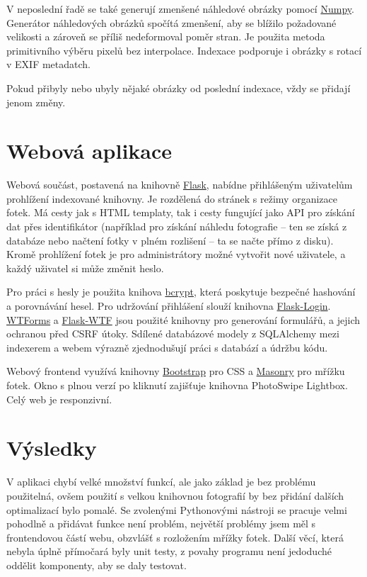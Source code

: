 \documentclass[czech]{template/pyt-report}
\begin{document}
V neposlední řadě se také generují zmenšené náhledové obrázky pomocí 
\href{https://numpy.org/}{Numpy}.
Generátor náhledových obrázků spočítá zmenšení, aby se blížilo požadované velikosti
a zároveň se příliš nedeformoval poměr stran. Je použita metoda primitivního 
výběru pixelů bez interpolace. Indexace podporuje i obrázky s rotací v EXIF metadatch.

Pokud přibyly nebo ubyly nějaké obrázky od poslední indexace, vždy se přidají jenom změny.
\section{Webová aplikace}
Webová součást, postavená na knihovně \href{https://flask.pocoo.org/}{Flask}, nabídne
přihlášeným uživatelům prohlížení indexované knihovny. Je rozdělená do stránek
s režimy organizace fotek.
Má cesty jak s HTML templaty, tak i cesty fungující jako API pro získání dat přes 
identifikátor (například pro získání náhledu fotografie -- ten se získá z databáze
nebo načtení fotky v plném rozlišení -- ta se načte přímo z disku). Kromě prohlížení
fotek je pro administrátory možné vytvořit nové uživatele, a každý uživatel si
může změnit heslo.

Pro práci s hesly je použita knihova \href{https://github.com/pyca/bcrypt/}{bcrypt},
která poskytuje bezpečné hashování a porovnávání hesel.
Pro udržování přihlášení slouží knihovna \href{https://github.com/maxcountryman/flask-login}{Flask-Login}.
\href{https://github.com/wtforms/wtforms}{WTForms} a \href{https://github.com/lepture/flask-wtf}{Flask-WTF}
jsou použité knihovny pro generování formulářů, a jejich ochranou před CSRF útoky.
Sdílené databázové modely z SQLAlchemy mezi indexerem a webem výrazně zjednodušují
práci s databází a údržbu kódu.

Webový frontend využívá knihovny \href{https://getbootstrap.com/}{Bootstrap} pro CSS
a \href{https://masonry.desandro.com/}{Masonry} pro mřížku fotek.
Okno s plnou verzí po kliknutí zajišťuje knihovna PhotoSwipe Lightbox.
Celý web je responzivní.
\section{Výsledky}
V aplikaci chybí velké množství funkcí, ale jako základ je bez problému použitelná, ovšem
použití s velkou knihovnou fotografií by bez přidání dalších optimalizací bylo pomalé.
Se zvolenými Pythonovými nástroji se pracuje velmi pohodlně a přidávat funkce není problém,
největší problémy jsem měl s frontendovou částí webu, obzvlášť s rozložením mřížky fotek.
Další věcí, která nebyla úplně přímočará byly unit testy, z povahy programu není jedoduché
oddělit komponenty, aby se daly testovat.
\end{document}
